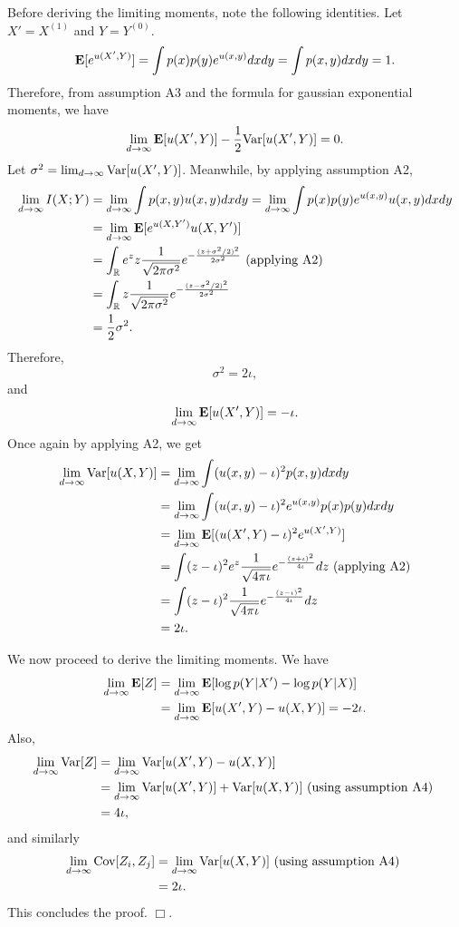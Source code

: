 \documentclass[12pt]{article}
\begin{document}
Before deriving the limiting moments, note the following identities.
Let $X' = X^{(1)}$ and $Y = Y^{(0)}$.
\[
\textbf{E}[e^{u(X', Y)}] = \int p(x) p(y) e^{u(x, y)} dx dy = \int p(x, y) dx dy = 1.
\]
Therefore, from assumption A3 and the formula for gaussian exponential
moments, we have
\[
\lim_{d \to \infty} \textbf{E}[u(X', Y)]-\frac{1}{2}\text{Var}[u(X', Y)] = 0.
\]
Let $\sigma^2 = \lim_{d \to \infty} \text{Var}[u(X', Y)]$.
Meanwhile, by applying assumption A2,
\begin{align*}
\lim_{d \to \infty} I(X; Y) &= \lim_{d \to \infty} \int p(x, y) u(x, y) dx dy 
= \lim_{d \to \infty} \int p(x) p(y) e^{u(x, y)} u(x, y) dx dy
\\&= \lim_{d \to \infty}  \textbf{E}[e^{u(X, Y')}u(X, Y')]
\\&= \int_{\mathbb{R}} e^z z \frac{1}{\sqrt{2\pi \sigma^2}} 
e^{-\frac{(z + \sigma^2/2)^2}{2\sigma^2}} \text{ (applying A2)}
\\&= \int_{\mathbb{R}} z \frac{1}{\sqrt{2\pi \sigma^2}} 
e^{-\frac{(z - \sigma^2/2)^2}{2\sigma^2}}
\\&= \frac{1}{2}\sigma^2.
\end{align*}
Therefore,
\[
\sigma^2 = 2\iota,
\]
and
\[
\lim_{d \to \infty} \textbf{E}[u(X', Y)] = -\iota.
\]
Once again by applying A2, we get
\begin{align*}
\lim_{d \to \infty} \text{Var}[u(X, Y)] 
&= \lim_{d \to \infty} \int (u(x, y) - \iota)^2 p(x, y) dx dy
\\&= \lim_{d \to \infty} \int (u(x, y) - \iota)^2 e^{u(x, y)} p(x) p(y) dx dy
\\&= \lim_{d \to \infty} \textbf{E}[(u(X', Y) - \iota)^2 e^{u(X', Y)}] 
\\&= \int (z - \iota)^2 e^z \frac{1}{\sqrt{4\pi\iota}} e^{-\frac{(z+\iota)^2}{4\iota}} dz \text{ (applying A2)}
\\&= \int (z - \iota)^2 \frac{1}{\sqrt{4\pi\iota}} e^{-\frac{(z-\iota)^2}{4\iota}} dz
\\&= 2\iota.
\end{align*}


We now proceed to derive the limiting moments.
We have
\begin{align*}
\lim_{d \to \infty} \textbf{E}[Z] 
&= \lim_{d \to \infty} \textbf{E}[ \log p(Y|X') - \log p(Y|X)]
\\&= \lim_{d \to \infty} \textbf{E}[ u(X', Y) - u(X, Y) ] = -2\iota.
\end{align*}
Also,
\begin{align*}
\lim_{d \to \infty} \text{Var}[Z]
 &= \lim_{d \to \infty} \text{Var}[ u(X', Y) - u(X, Y) ]
\\&= \lim_{d \to \infty} \text{Var}[ u(X', Y)] +\text{Var}[ u(X, Y) ]\text{ (using assumption A4) }
\\&= 4\iota,
\end{align*}
and similarly
\begin{align*}
\lim_{d \to \infty} \text{Cov}[Z_i, Z_j]
&= \lim_{d \to \infty} \text{Var}[ u(X, Y)]\text{ (using assumption A4) }
\\&= 2\iota.
\end{align*}
This concludes the proof. $\Box$.
\end{document}
